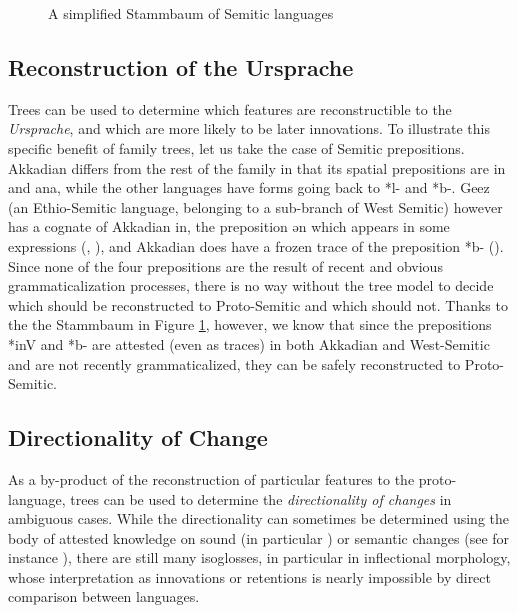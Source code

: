 \documentclass[svgnames,12pt]{scrartcl}
\newcommand{\ipa}[1]{{{\phon\mbox{#1}}}}
\begin{document}
{{\begin{figure}[h]
\caption{A simplified Stammbaum of Semitic languages} \label{fig:semitic}   \centering
\end{figure}

\subsection{Reconstruction of the Ursprache}
Trees can be used to determine which features are reconstructible to the \emph{Ursprache}, and which are
more likely to be later innovations. To illustrate this specific benefit of family trees, let us
take the case of Semitic  prepositions. Akkadian differs from the rest of the family in that its
spatial prepositions are \ipa{in} and \ipa{ana}, while the other languages have forms going back
to \ipa{*l-} and \ipa{*b-}. Geez (an Ethio-Semitic language, belonging to a sub-branch of West
Semitic) however has a cognate of Akkadian \ipa{in}, the preposition \ipa{ən} which appears in some
expressions (\citealt[16]{huehnergard06protosemitic}, \citealt[119]{kogan15semitic}), and Akkadian
does have a frozen trace of the preposition \ipa{*b-} (\citealt[45-6]{rubin05semitic}). Since none
of the four prepositions are the result of recent and obvious grammaticalization processes, there is
no way without the tree model to decide which should be reconstructed to Proto-Semitic and which
should not. 
Thanks to the the Stammbaum in Figure \ref{fig:semitic}, however, we know that since the
prepositions  \ipa{*inV} and  \ipa{*b-} are attested (even as traces) in both Akkadian and
West-Semitic and are not recently grammaticalized, they can be safely reconstructed to Proto-Semitic.

\subsection{Directionality of Change}
As a by-product of the reconstruction of particular features to the proto-language, trees can be
used to determine the \emph{directionality of changes} in ambiguous cases. While the directionality
can sometimes be determined using the body of attested knowledge on sound (in particular
\citealt{kuemmel07wandel}) or semantic changes (see for instance \citealt{urban11semantic}), there
are still many isoglosses, in particular in inflectional morphology, whose interpretation as innovations or retentions is nearly impossible by direct comparison between languages. 
 
}}
\end{document}
